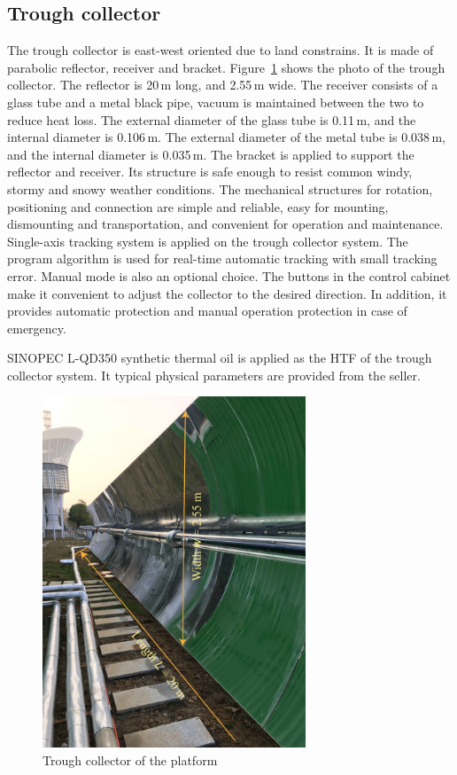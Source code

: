 \subsection{Trough collector}
The trough collector is east-west oriented due to land constrains. It is made of parabolic reflector, receiver and bracket. Figure~\ref{fig:TroughCollector} shows the photo of the trough collector. The reflector is 20$\,\mathrm{m}$ long, and 2.55$\,\mathrm{m}$ wide. The receiver consists of a glass tube and a metal black pipe, vacuum is maintained between the two to reduce heat loss. 
The external diameter of the glass tube is 0.11$\,\mathrm{m}$, and the internal diameter is 0.106$\,\mathrm{m}$.
The external diameter of the metal tube is 0.038$\,\mathrm{m}$, and the internal diameter is 0.035$\,\mathrm{m}$.
The bracket is applied to support the reflector and receiver. Its structure is safe enough to resist common windy, stormy and snowy weather conditions. The mechanical structures for rotation, positioning and connection are simple and reliable, easy for mounting, dismounting and transportation, and convenient for operation and maintenance.
Single-axis tracking system is applied on the trough collector system. The program algorithm is used for real-time automatic tracking with small tracking error. Manual mode is also an optional choice. The buttons in the control cabinet make it convenient to adjust the collector to the desired direction. In addition, it provides automatic protection and manual operation protection in case of emergency.

SINOPEC L-QD350 synthetic thermal oil is applied as the HTF of the trough collector system. It typical physical parameters are provided from the seller.

\begin{figure}[!ht]
\centering
\includegraphics[width=0.7\textwidth]{fig/TroughCollector.jpg}
\caption{Trough collector of the platform}\label{fig:TroughCollector}
\end{figure}

